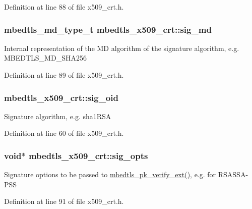 Definition at line 88 of file x509\-\_\-crt.\-h.

\hypertarget{structmbedtls__x509__crt_a5c56937aaf2a51a1d8bc814b142734ca}{
\subsubsection[{sig\-\_\-md}]{\setlength{\rightskip}{0pt plus 5cm}mbedtls\-\_\-md\-\_\-type\-\_\-t mbedtls\-\_\-x509\-\_\-crt\-::sig\-\_\-md}}\label{structmbedtls__x509__crt_a5c56937aaf2a51a1d8bc814b142734ca}
Internal representation of the M\-D algorithm of the signature algorithm, e.\-g. M\-B\-E\-D\-T\-L\-S\-\_\-\-M\-D\-\_\-\-S\-H\-A256 

Definition at line 89 of file x509\-\_\-crt.\-h.

\hypertarget{structmbedtls__x509__crt_a128c3a665ffdce696b402435a74e97aa}{
\subsubsection[{sig\-\_\-oid}]{ mbedtls\-\_\-x509\-\_\-crt\-::sig\-\_\-oid}}\label{structmbedtls__x509__crt_a128c3a665ffdce696b402435a74e97aa}
Signature algorithm, e.\-g. sha1\-R\-S\-A 

Definition at line 60 of file x509\-\_\-crt.\-h.

\hypertarget{structmbedtls__x509__crt_a67c497ed6535050997c014507a866e9e}{
\subsubsection[{sig\-\_\-opts}]{\setlength{\rightskip}{0pt plus 5cm}void$\ast$ mbedtls\-\_\-x509\-\_\-crt\-::sig\-\_\-opts}}\label{structmbedtls__x509__crt_a67c497ed6535050997c014507a866e9e}
Signature options to be passed to \hyperlink{pk_8h_a81f0c5e40b839f5eca676c2c2752036f}{mbedtls\-\_\-pk\-\_\-verify\-\_\-ext()}, e.\-g. for R\-S\-A\-S\-S\-A-\/\-P\-S\-S 

Definition at line 91 of file x509\-\_\-crt.\-h.

